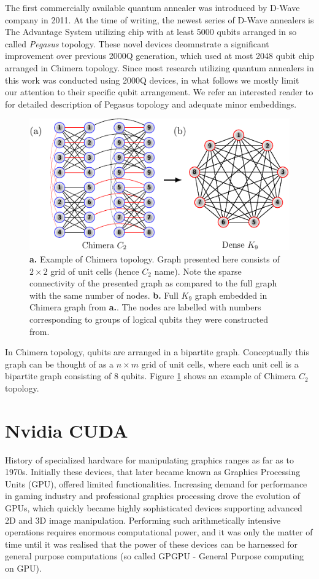 The first commercially available quantum annealer was introduced by D-Wave company in 2011. At the time of writing, the newest series of D-Wave annealers is The Advantage System utilizing chip with at least 5000 qubits arranged in so called \emph{Pegasus} topology. These novel devices deomnstrate a significant improvement over previous 2000Q generation, which used at most 2048 qubit chip arranged in Chimera topology. Since most research utilizing quantum annealers in this work was conducted using 2000Q devices, in what follows we mostly limit our attention to their specific qubit arrangement. We refer an interested reader to \cite{boothby} for detailed description of Pegasus topology and adequate minor embeddings.

\begin{figure}[h]
    \centering
    \includegraphics[width=\textwidth]{figures/chimera.pdf}
    \caption{\textbf{a.} Example of Chimera topology. Graph presented here consists of $2 \times 2$ grid of unit cells (hence $C_2$ name). Note the sparse connectivity of the presented graph as compared to the full graph with the same number of nodes. \textbf{b.} Full $K_9$ graph embedded in Chimera graph from \textbf{a.}. The nodes are labelled with numbers corresponding to groups of logical qubits they were constructed from.}
    \label{fig:chimera}
\end{figure}

In Chimera topology, qubits are arranged in a bipartite graph. Conceptually this graph can be thought of as a $n \times m$ grid of unit cells, where each unit cell is a bipartite graph consisting of $8$ qubits. Figure \ref{fig:chimera} shows an example of Chimera $C_{2}$ topology.


\section{Nvidia CUDA}
History of specialized hardware for manipulating graphics ranges as far as to 1970s. Initially these devices, that later became known as Graphics Processing Units (GPU), offered limited functionalities. Increasing demand for performance in gaming industry and professional graphics processing drove the evolution of GPUs, which quickly became highly sophisticated devices supporting advanced 2D and 3D image manipulation. Performing such arithmetically intensive operations requires enormous computational power, and it was only the matter of time until it was realised that the power of these devices can be harnessed for general purpose computations (so called GPGPU - General Purpose computing on GPU). 

